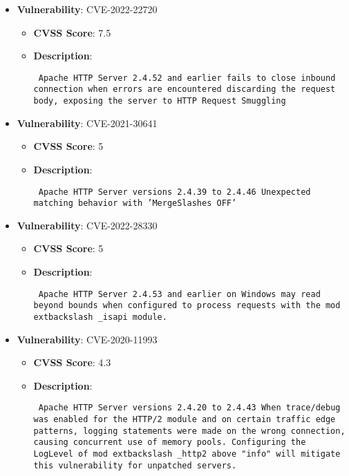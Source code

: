 \documentclass{article}
\begin{document}
\begin{itemize}
        \item \textbf{Vulnerability}: CVE-2022-22720
        \begin{itemize}
            \item \textbf{CVSS Score}:  7.5 
            \item \textbf{Description}: \parbox{\linewidth}{\texttt{ Apache HTTP Server 2.4.52 and earlier fails to close inbound connection when errors are encountered discarding the request body, exposing the server to HTTP Request Smuggling }}
        \end{itemize}
    
        \item \textbf{Vulnerability}: CVE-2021-30641
        \begin{itemize}
            \item \textbf{CVSS Score}:  5 
            \item \textbf{Description}: \parbox{\linewidth}{\texttt{ Apache HTTP Server versions 2.4.39 to 2.4.46 Unexpected matching behavior with 'MergeSlashes OFF' }}
        \end{itemize}
    
        \item \textbf{Vulnerability}: CVE-2022-28330
        \begin{itemize}
            \item \textbf{CVSS Score}:  5 
            \item \textbf{Description}: \parbox{\linewidth}{\texttt{ Apache HTTP Server 2.4.53 and earlier on Windows may read beyond bounds when configured to process requests with the mod	extbackslash _isapi module. }}
        \end{itemize}
    
        \item \textbf{Vulnerability}: CVE-2020-11993
        \begin{itemize}
            \item \textbf{CVSS Score}:  4.3 
            \item \textbf{Description}: \parbox{\linewidth}{\texttt{ Apache HTTP Server versions 2.4.20 to 2.4.43 When trace/debug was enabled for the HTTP/2 module and on certain traffic edge patterns, logging statements were made on the wrong connection, causing concurrent use of memory pools. Configuring the LogLevel of mod	extbackslash _http2 above "info" will mitigate this vulnerability for unpatched servers. }}
        \end{itemize}
    

\end{itemize}
\end{document}
